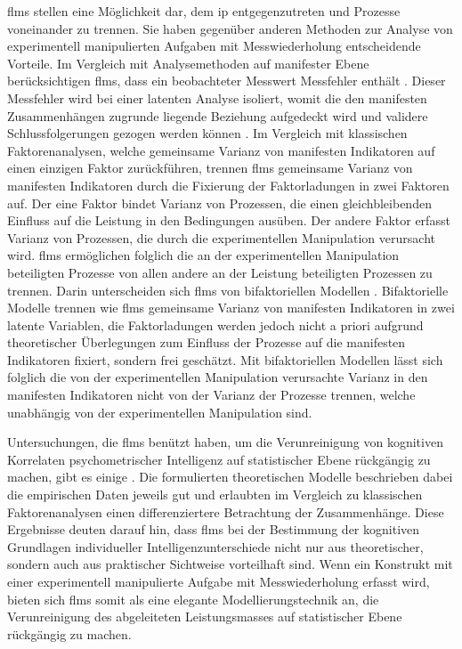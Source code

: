 \documentclass[11pt, twoside, a4paper]{book}		%
\begin{document}
\glspl{flm} stellen eine Möglichkeit dar, dem \gls{ip} entgegenzutreten und Prozesse voneinander zu trennen. Sie haben gegenüber anderen Methoden zur Analyse von experimentell manipulierten Aufgaben mit Messwiederholung entscheidende Vorteile.
Im Vergleich mit Analysemethoden auf manifester Ebene berücksichtigen \glspl{flm}, dass ein beobachteter Messwert Messfehler enthält \citep{Moosbrugger2007}. Dieser Messfehler wird bei einer latenten Analyse isoliert, womit die den manifesten Zusammenhängen zugrunde liegende Beziehung aufgedeckt wird und validere Schlussfolgerungen gezogen werden können \citep[S. 9]{Kline2011}.
Im Vergleich mit klassischen Faktorenanalysen, welche gemeinsame Varianz von manifesten Indikatoren auf einen einzigen Faktor zurückführen, trennen \glspl{flm} gemeinsame Varianz von manifesten Indikatoren durch die Fixierung der Faktorladungen in zwei Faktoren auf. 
Der eine Faktor bindet Varianz von Prozessen, die einen gleichbleibenden Einfluss auf die Leistung in den Bedingungen ausüben. Der andere Faktor erfasst Varianz von Prozessen, die durch die experimentellen Manipulation verursacht wird.
\glspl{flm} ermöglichen folglich die an der experimentellen Manipulation beteiligten Prozesse von allen andere an der Leistung beteiligten Prozessen zu trennen.
Darin unterscheiden sich \glspl{flm} von bifaktoriellen Modellen \citep[z.~B.][]{Moosbrugger2006, Schweizer2010}. Bifaktorielle Modelle trennen wie \glspl{flm} gemeinsame Varianz von manifesten Indikatoren in zwei latente Variablen, die Faktorladungen werden jedoch nicht a priori aufgrund theoretischer Überlegungen zum Einfluss der Prozesse auf die manifesten Indikatoren fixiert, sondern frei geschätzt. Mit bifaktoriellen Modellen lässt sich folglich die von der experimentellen Manipulation verursachte Varianz in den manifesten Indikatoren nicht von der Varianz der Prozesse trennen, welche unabhängig von der experimentellen Manipulation sind.

Untersuchungen, die \glspl{flm} benützt haben, um die Verunreinigung von kognitiven Korrelaten psychometrischer Intelligenz auf statistischer Ebene rückgängig zu machen, gibt es einige \citep[z.~B.][]{Ren2013, Schweizer2007, Stankov2007, Wang2015}. Die formulierten theoretischen Modelle beschrieben dabei die empirischen Daten jeweils gut und erlaubten im Vergleich zu klassischen Faktorenanalysen einen differenziertere Betrachtung der Zusammenhänge. Diese Ergebnisse deuten darauf hin, dass \glspl{flm} bei der Bestimmung der kognitiven Grundlagen individueller Intelligenzunterschiede nicht nur aus theoretischer, sondern auch aus praktischer Sichtweise vorteilhaft sind.
Wenn ein Konstrukt mit einer experimentell manipulierte Aufgabe mit Messwiederholung erfasst wird, bieten sich \glspl{flm} \citep[z.~B.][]{Schweizer2006a, Schweizer2006b, Schweizer2007, Schweizer2008, Schweizer2009a} somit als eine elegante Modellierungstechnik an, die Verunreinigung des abgeleiteten Leistungsmasses auf statistischer Ebene rückgängig zu machen.
\end{document}
